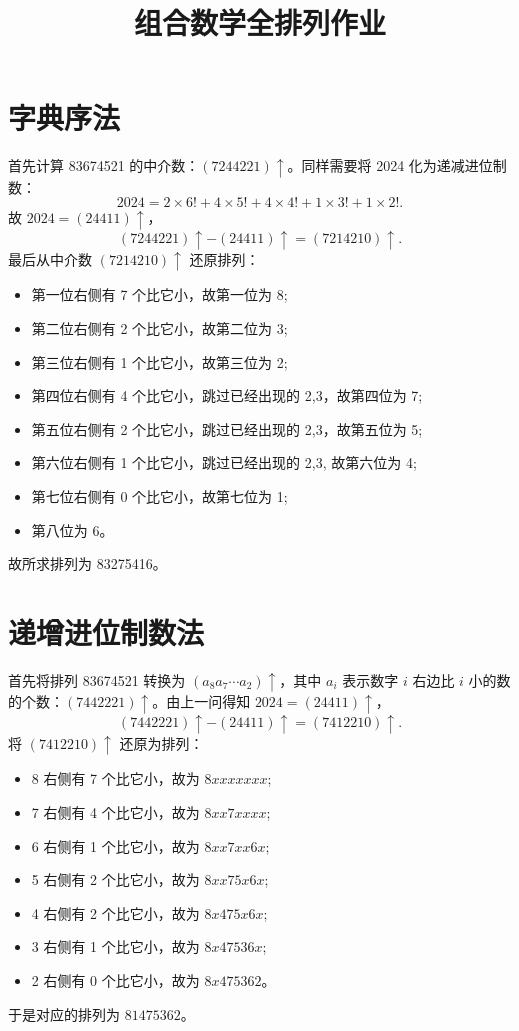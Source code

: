 \documentclass{article}
\title{组合数学\quad 全排列作业}
\begin{document}
\maketitle

\section{字典序法}
首先计算 83674521 的中介数：$(7244221)\uparrow$。同样需要将 2024 化为递减进位制数：
\begin{equation}
    2024=2\times 6!+4\times 5!+4\times 4!+1\times 3!+1\times 2!.
\end{equation}
故 $2024=(24411)\uparrow$，
\begin{equation}
    (7244221)\uparrow - (24411)\uparrow = (7214210)\uparrow.
\end{equation}
最后从中介数 $(7214210)\uparrow$ 还原排列：
\begin{itemize}
    \item 第一位右侧有 7 个比它小，故第一位为 8;
    \item 第二位右侧有 2 个比它小，故第二位为 3;
    \item 第三位右侧有 1 个比它小，故第三位为 2;
    \item 第四位右侧有 4 个比它小，跳过已经出现的 2,3，故第四位为 7;
    \item 第五位右侧有 2 个比它小，跳过已经出现的 2,3，故第五位为 5;
    \item 第六位右侧有 1 个比它小，跳过已经出现的 2,3, 故第六位为 4;
    \item 第七位右侧有 0 个比它小，故第七位为 1;
    \item 第八位为 6。
\end{itemize}
故所求排列为 83275416。

\section{递增进位制数法}
首先将排列 83674521 转换为 $(a_8a_7\cdots a_2)\uparrow$，其中 $a_i$ 表示数字 $i$ 右边比 $i$ 小的数的个数：$(7442221)\uparrow$。由上一问得知 $2024=(24411)\uparrow$，
\begin{equation}
    (7442221)\uparrow - (24411)\uparrow = (7412210)\uparrow.
\end{equation}
将 $(7412210)\uparrow$ 还原为排列：
\begin{itemize}
    \item 8 右侧有 7 个比它小，故为 $8xxxxxxx$;
    \item 7 右侧有 4 个比它小，故为 $8xx7xxxx$;
    \item 6 右侧有 1 个比它小，故为 $8xx7xx6x$;
    \item 5 右侧有 2 个比它小，故为 $8xx75x6x$;
    \item 4 右侧有 2 个比它小，故为 $8x475x6x$;
    \item 3 右侧有 1 个比它小，故为 $8x47536x$;
    \item 2 右侧有 0 个比它小，故为 $8x475362$。
\end{itemize}
于是对应的排列为 $81475362$。
\end{document}
